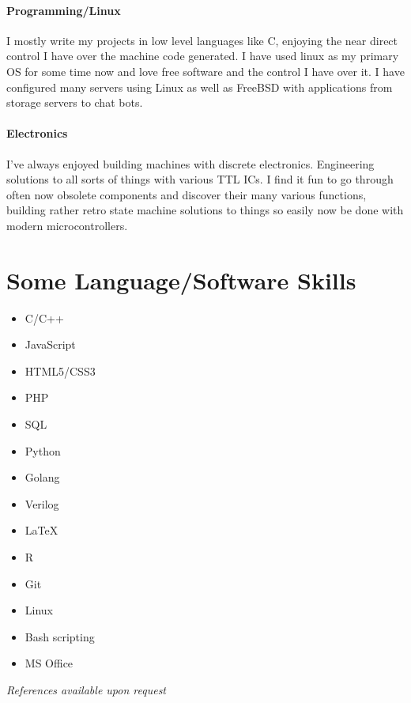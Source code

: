 \documentclass[9pt,a4paper]{article}
\begin{document}
\begin{multicols*}{2}
\paragraph{Programming/Linux} 
I mostly write my projects in low level languages like C, enjoying the near direct control I have over the machine code generated.
I have used linux as my primary OS for some time now and love free software and the control I have over it.
I have configured many servers using Linux as well as FreeBSD with applications from storage servers to chat bots.
\vspace*{-0.1cm}
\paragraph{Electronics} I've always enjoyed building machines with discrete electronics.
Engineering solutions to all sorts of things with various TTL ICs.
I find it fun to go through often now obsolete components and discover their many various functions, building rather retro state machine solutions to things so easily now be done with modern microcontrollers.

\section*{Some Language/Software Skills}
\begin{multicols*}{2}
\begin{itemize}
\item C/C++
\item JavaScript
\item HTML5/CSS3
\item PHP
\item SQL
\item Python
\item Golang
\item Verilog
\item \LaTeX 
\item R
\item Git
\item Linux
\item Bash scripting
\item MS Office
\end{itemize}
\end{multicols*}
\vfill
\textit{References available upon request}
\end{multicols*}
\end{document}
